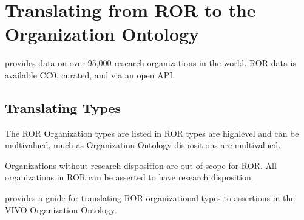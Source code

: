 \documentclass[letterpaper,10pt,english]{sphinxmanual}
\begin{document}
\chapter{Translating from ROR to the Organization Ontology}
\label{\detokenize{ror-to-org:translating-from-ror-to-the-organization-ontology}}\label{\detokenize{ror-to-org::doc}}
\sphinxAtStartPar
{} provides data on over 95,000 research organizations in the world.  ROR data
is available CC0, curated, and via an open API.


\section{Translating Types}
\label{\detokenize{ror-to-org:translating-types}}
\sphinxAtStartPar
The ROR Organization types are listed in {\hyperref[\detokenize{ror-to-org:table-17}]{}}  ROR types are high\sphinxhyphen{}level and can
be multi\sphinxhyphen{}valued, much as Organization Ontology dispositions are multi\sphinxhyphen{}valued.

\sphinxAtStartPar
Organizations without research disposition are out of scope for ROR.  All organizations in
ROR can be asserted to have research disposition.

\sphinxAtStartPar
{\hyperref[\detokenize{ror-to-org:table-17}]{}} provides a guide for translating ROR organizational types to assertions
in the VIVO Organization Ontology.
\end{document}

